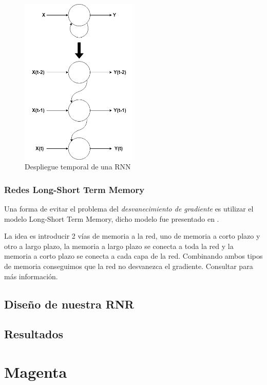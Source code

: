     \begin{figure}
        \centering
        \includegraphics[width=0.5\textwidth]{Imagenes/Bitmap/RNN.png}
        \caption{Despliegue temporal de una RNN}
        \label{fig:simpleRNN}
    \end{figure}

    \subsubsection{Redes Long-Short Term Memory}
    \label{subsub:redesLSTM}
    Una forma de evitar el problema del \textit{desvanecimiento de gradiente} es utilizar el modelo Long-Short Term Memory, dicho modelo fue presentado en \cite{LSTMArticle}.

    La idea es introducir 2 vías de memoria a la red, uno de memoria a corto plazo y otro a largo plazo, la memoria a largo plazo se conecta a toda la red y la memoria a corto plazo se conecta a cada capa de la red. Combinando ambos tipos de memoria conseguimos que la red no desvanezca el gradiente. Consultar \cite{LSTMWikipedia} para más información.

    \subsection{Diseño de nuestra RNR}
    \label{subsec:disenoRNR}

    \subsection{Resultados}
    \label{subsec:resultadosRNR}

\section{Magenta}
\label{sec:magenta}
